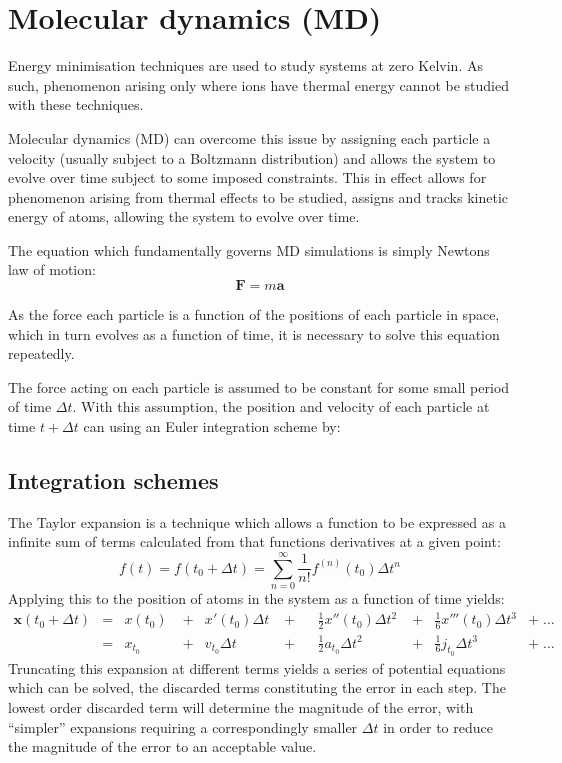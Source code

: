 \section{{\color{red}Molecular dynamics (MD)}}
\label{sec:MD}
Energy minimisation techniques are used to study systems at zero Kelvin.
As such, phenomenon arising only where ions have thermal energy cannot be studied with these techniques.

Molecular dynamics (MD) can overcome this issue by assigning each particle a velocity (usually subject to a Boltzmann distribution) and allows the system to evolve over time subject to some imposed constraints.
This in effect allows for phenomenon arising from thermal effects to be studied,
assigns and tracks kinetic energy of atoms, allowing the system to evolve over time.

The equation which fundamentally governs MD simulations is simply Newtons law of motion:
\begin{equation}
	\mathbf{F} = m\mathbf{a}
\end{equation}

As the force each particle is a function of the positions of each particle in space, which in turn evolves as a function of time, it is necessary to solve this equation repeatedly.

The force acting on each particle is assumed to be constant for some small period of time $\Delta t$.
With this assumption, the position and velocity of each particle at time $t+\Delta t$ can using an Euler integration scheme by:
\newpage
\subsection{Integration schemes}
The Taylor expansion is a technique which allows a function to be expressed as a infinite sum of terms calculated from that functions derivatives at a given point:
\begin{equation}
f(t) = f(t_0 + \Delta t) = \sum_{n=0}^\infty \frac{1}{n!}f^{(n)}(t_0)\Delta t^n
\end{equation}
Applying this to the position of atoms in the system as a function of time yields:
\begin{align}
\mathbf{x}(t_0 + \Delta t) &= &x(t_0) \; &+ &x'(t_0)\Delta t \;&+& &\frac{1}{2}x''(t_0)\Delta t^2 \;&+& \frac{1}{6}x'''(t_0)\Delta t^3& +\;\dots\\
                           &= &x_{t_0} \; &+  &v_{t_0}\Delta t \;&+&   &\frac{1}{2}a_{t_0}\Delta t^2     \;&+& \frac{1}{6}j_{t_0}\Delta t^3& +\;\dots
\end{align}
Truncating this expansion at different terms yields a series of potential equations which can be solved, the discarded terms constituting the error in each step.
The lowest order discarded term will determine the magnitude of the error, with ``simpler'' expansions requiring a correspondingly smaller $\Delta t$ in order to reduce the magnitude of the error to an acceptable value.

